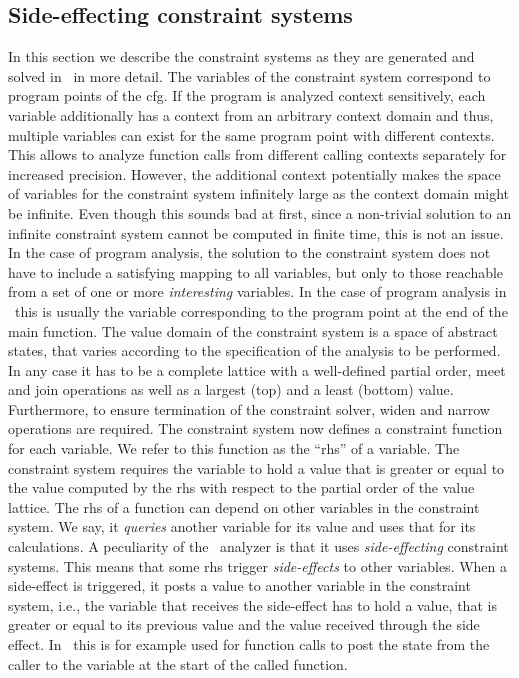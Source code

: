   \subsection{Side-effecting constraint systems}
  \label{sec:background:constrSys}
  In this section we describe the constraint systems as they are generated and solved in \gob\ in more detail. The variables of the constraint system correspond to program points of the \ac{cfg}. If the program is analyzed context sensitively, each variable additionally has a context from an arbitrary context domain and thus, multiple variables can exist for the same program point with different contexts. This allows to analyze function calls from different calling contexts separately for increased precision. However, the additional context potentially makes the space of variables for the constraint system infinitely large as the context domain might be infinite. Even though this sounds bad at first, since a non-trivial solution to an infinite constraint system cannot be computed in finite time, this is not an issue. In the case of program analysis, the solution to the constraint system does not have to include a satisfying mapping to all variables, but only to those reachable from a set of one or more \textit{interesting} variables. In the case of program analysis in \gob\ this is usually the variable corresponding to the program point at the end of the main function.
  The value domain of the constraint system is a space of abstract states, that varies according to the specification of the analysis to be performed. In any case it has to be a complete lattice with a well-defined partial order, meet and join operations as well as a largest (top) and a least (bottom) value. Furthermore, to ensure termination of the constraint solver, widen and narrow operations are required.
  The constraint system now defines a constraint function for each variable. We refer to this function as the ``\ac{rhs}'' of a variable. The constraint system requires the variable to hold a value that is greater or equal to the value computed by the \ac{rhs} with respect to the partial order of the value lattice.
  The \ac{rhs} of a function can depend on other variables in the constraint system. We say, it \textit{queries} another variable for its value and uses that for its calculations.
  A peculiarity of the \gob\ analyzer is that it uses \textit{side-effecting} constraint systems. This means that some \ac{rhs} trigger \textit{side-effects} to other variables. When a side-effect is triggered, it posts a value to another variable in the constraint system, i.e., the variable that receives the side-effect has to hold a value, that is greater or equal to its previous value and the value received through the side effect. In \gob\ this is for example used for function calls to post the state from the caller to the variable at the start of the called function.
